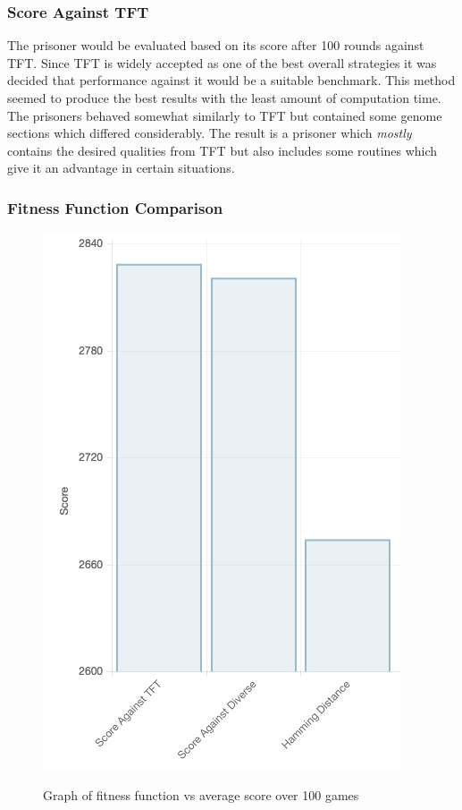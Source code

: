\documentclass[12pt]{article}
\begin{document}
\subsubsection{Score Against TFT}
\label{tft}

The prisoner would be evaluated based on its score after 100 rounds against
TFT.  Since TFT is widely accepted as one of the best overall strategies it was
decided that performance against it would be a suitable benchmark.
This method seemed to produce the best results with the least
amount of computation time.  The prisoners behaved somewhat similarly
to TFT but contained some genome sections which differed considerably.  The result
is a prisoner which \textit{mostly} contains the desired qualities from TFT
but also includes some routines which give it an advantage in certain situations.


\subsubsection{Fitness Function Comparison}

\begin{figure}[h]
    \label{fig2}
    \caption{Graph of fitness function vs average score over 100 games}
    \centering
    \includegraphics[scale=0.5]{figures/fit_score.png}
    \label{fig1}
\end{figure}
\end{document}
